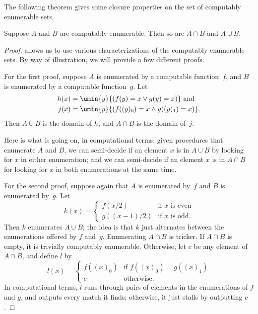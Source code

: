 \documentclass[../../../include/open-logic-section]{subfiles}
\begin{document}


The following theorem gives some closure properties on the set of
computably enumerable sets.

\begin{thm}
Suppose $A$ and $B$ are computably enumerable. Then so are $A \cap B$
and $A \cup B$.
\end{thm}

\begin{proof}
 allows us to use various characterizations
of the computably enumerable sets. By way of illustration, we will
provide a few different proofs.

For the first proof, suppose $A$ is enumerated by a computable
function~$f$, and $B$ is enumerated by a computable function~$g$. Let
\begin{align*}
h(x) & = \umin{y}{(f(y) = x \lor g(y) = x)} \text{ and}\\
j(x) & = \umin{y}{(f((y)_0) = x \land g((y)_1) = x)}.
\end{align*}
Then $A \cup B$ is the domain of $h$, and $A \cap B$ is the domain
of~$j$.

\begin{explain}
Here is what is going on, in computational terms: given
procedures that enumerate $A$ and $B$, we can semi-decide if an
element $x$ is in $A \cup B$ by looking for $x$ in either enumeration;
and we can semi-decide if an element $x$ is in $A \cap B$ for looking
for $x$ in both enumerations at the same time.
\end{explain}

For the second proof, suppose again that $A$ is enumerated by~$f$ and
$B$ is enumerated by~$g$. Let
\[
k(x) = \begin{cases}
f(x/2) & \text{if $x$ is even} \\
g((x-1)/2) & \text{if $x$ is odd.}
\end{cases}
\]
Then $k$ enumerates $A \cup B$; the idea is that $k$ just alternates
between the enumerations offered by $f$ and~$g$. Enumerating $A \cap
B$ is tricker. If $A \cap B$ is empty, it is trivially computably
enumerable. Otherwise, let $c$ be any element of $A \cap B$, and
define $l$ by
\[
l(x) = \begin{cases}
f((x)_0) & \text{if $f((x)_0) = g((x)_1)$} \\
c & \text{otherwise.}
\end{cases}
\]
In computational terms, $l$ runs through pairs of elements in the
enumerations of $f$ and $g$, and outputs every match it finds;
otherwise, it just stalls by outputting $c$.


\end{proof}
\end{document}
